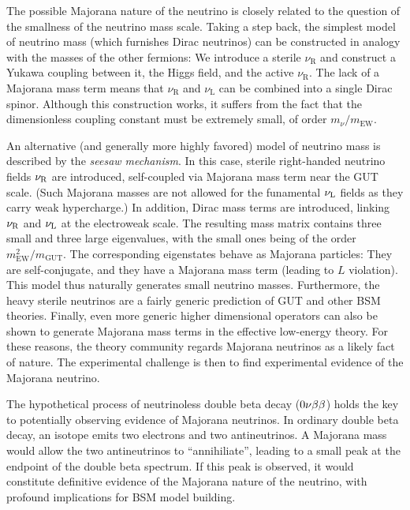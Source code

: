 \documentclass[../thesis.tex]{subfiles}
\begin{document}
The possible Majorana nature of the neutrino is closely related to the question
of the smallness of the neutrino mass scale. Taking a step back, the simplest
model of neutrino mass (which furnishes Dirac neutrinos) can be constructed in
analogy with the masses of the other fermions: We introduce a sterile
$\nu_{\text{R}}$ and construct a Yukawa coupling between it, the Higgs field, and
the active $\nu_{\text{R}}$. The lack of a Majorana mass term means that
$\nu_{\text{R}}$ and $\nu_{\text{L}}$ can be combined into a single Dirac spinor.
Although this construction works, it suffers from the fact that the
dimensionless coupling constant must be extremely small, of order
$m_\nu/m_{\text{EW}}$.

An alternative (and generally more highly favored) model of neutrino mass is
described by the \emph{seesaw mechanism}. In this case, sterile right-handed
neutrino fields $\nu_{\text{R}}$ are introduced, self-coupled via Majorana mass term near
the GUT scale. (Such Majorana masses are not allowed for the funamental $\nu_{\text{L}}$
fields as they carry weak hypercharge.) In addition, Dirac mass terms are
introduced, linking $\nu_{\text{R}}$ and $\nu_{\text{L}}$ at the electroweak scale. The resulting
mass matrix contains three small and three large eigenvalues, with the small
ones being of the order $m^2_{\text{EW}} / m_{\text{GUT}}$. The corresponding
eigenstates behave as Majorana particles: They are self-conjugate, and they have
a Majorana mass term (leading to $L$ violation). This model thus naturally
generates small neutrino masses. Furthermore, the heavy sterile neutrinos are a
fairly generic prediction of GUT and other BSM theories. Finally, even more
generic higher dimensional operators can also be shown to generate Majorana mass
terms in the effective low-energy theory. For these reasons, the theory
community regards Majorana neutrinos as a likely fact of nature. The
experimental challenge is then to find experimental evidence of the Majorana
neutrino.

The hypothetical process of neutrinoless double beta decay ($0\nu\beta\beta$) holds the
key to potentially observing evidence of Majorana neutrinos. In ordinary double
beta decay, an isotope emits two electrons and two antineutrinos. A Majorana
mass would allow the two antineutrinos to ``annihiliate'', leading to a small
peak at the endpoint of the double beta spectrum. If this peak is observed, it
would constitute definitive evidence of the Majorana nature of the neutrino,
with profound implications for BSM model building.
\end{document}
